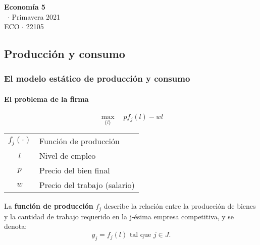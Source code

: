 \documentclass[8pt,a4paper]{extarticle}
\renewcommand{\csClass}{Economía 5}
\renewcommand{\csClassCode}{ECO $\cdot$ 22105}
\renewcommand{\csTerm}{Primavera 2021}
\begin{document}
\begin{titlepage}
	\begin{center}
		\vspace*{1cm}
		\Huge
		\textbf{\csClass}
		\vspace{0.5cm} \\
		\Large
		\cs\ $\cdot$ \csTerm
		\vfill
		\csAuthorName\\
		\vspace{0.8cm}
		\csClassCode\\
		\csSchool
	\end{center}
\end{titlepage}

\begin{multicols}{3}
	\setcounter{page}{1}

	\part{Producción y consumo}

	\section{El modelo estático de producción y consumo}

	\subsection{El problema de la firma}

	\begin{equation*}
		\max_{\{l\}} \quad pf_j (l) - wl
	\end{equation*}

	\begin{center}
		\begin{tabular}{ c l }
			\hline
			$f_j(\cdot)$ & Función de producción        \\
			$l$          & Nivel de empleo              \\
			$p$          & Precio del bien final        \\
			$w$          & Precio del trabajo (salario) \\
			\hline
		\end{tabular}
	\end{center}

	\begin{boxdef}
		La \textbf{función de producción} $f_j$ describe la relación entre la producción de bienes y la cantidad de trabajo requerido en la j-ésima empresa competitiva, y se denota:
		\[
			y_j = f_j(l) \text{ tal que } j \in J
			.\]
	\end{boxdef}


\end{multicols}
\end{document}
